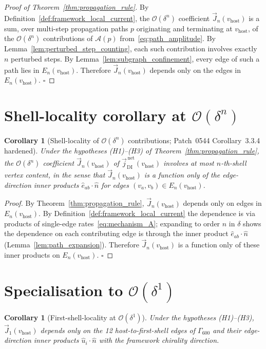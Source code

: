 \documentclass[11pt,letterpaper]{article}
\newtheorem{corollary}[theorem]{Corollary}
\newcommand{\nhat}{\hat{n}}
\newcommand{\vhost}{v_{\text{host}}}
\newcommand{\jDInet}{\vec{j}_{\text{DI}}^{\,\text{net}}}
\newcommand{\Eorder}[1]{\mathcal{O}(\delta^{#1})}
\newcommand{\Gsixcell}{\Gamma_{600}}
\begin{document}
\begin{proof}[Proof of Theorem~\ref{thm:propagation_rule}]
By Definition~\ref{def:framework_local_current}, the $\Eorder{n}$ coefficient $\vec{J}_n(\vhost)$ is a sum, over multi-step propagation paths $p$ originating and terminating at $\vhost$, of the $\Eorder{n}$ contributions of $\mathcal{A}(p)$ from~\eqref{eq:path_amplitude}. By Lemma~\ref{lem:perturbed_step_counting}, each such contribution involves exactly $n$ perturbed steps. By Lemma~\ref{lem:subgraph_confinement}, every edge of such a path lies in $E_n(\vhost)$. Therefore $\vec{J}_n(\vhost)$ depends only on the edges in $E_n(\vhost)$. $\square$
\end{proof}

\section{Shell-locality corollary at $\Eorder{n}$}\label{sec:shell_locality}

\begin{corollary}[Shell-locality of $\Eorder{n}$ contributions; Patch~0544 Corollary~3.3.4 hardened]\label{cor:shell_locality}
Under the hypotheses (H1)--(H3) of Theorem~\ref{thm:propagation_rule}, the $\Eorder{n}$ coefficient $\vec{J}_n(\vhost)$ of $\jDInet(\vhost)$ involves at most $n$-th-shell vertex content, in the sense that $\vec{J}_n(\vhost)$ is a function only of the edge-direction inner products $\hat{e}_{ab}\cdot\nhat$ for edges $(v_a, v_b) \in E_n(\vhost)$.
\end{corollary}

\begin{proof}
By Theorem~\ref{thm:propagation_rule}, $\vec{J}_n(\vhost)$ depends only on edges in $E_n(\vhost)$. By Definition~\ref{def:framework_local_current} the dependence is via products of single-edge rates~\eqref{eq:mechanism_A}; expanding to order $n$ in $\delta$ shows the dependence on each contributing edge is through the inner product $\hat{e}_{ab}\cdot\nhat$ (Lemma~\ref{lem:path_expansion}). Therefore $\vec{J}_n(\vhost)$ is a function only of these inner products on $E_n(\vhost)$. $\square$
\end{proof}

\section{Specialisation to $\Eorder{1}$}\label{sec:specialisation_n1}

\begin{corollary}[First-shell-locality at $\Eorder{1}$]\label{cor:first_shell_locality}
Under the hypotheses (H1)--(H3), $\vec{J}_1(\vhost)$ depends only on the 12 host-to-first-shell edges of $\Gsixcell$ and their edge-direction inner products $\hat{u}_i\cdot\nhat$ with the framework chirality direction.
\end{corollary}
\end{document}
